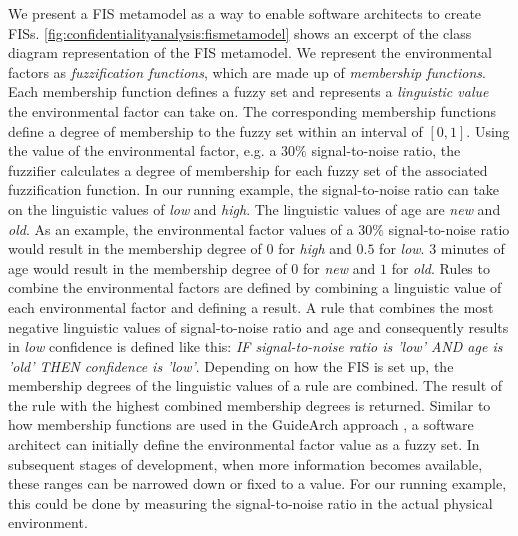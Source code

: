 We present a \ac{FIS} metamodel as a way to enable software architects to create \acp{FIS}.
\autoref{fig:confidentialityanalysis:fismetamodel} shows an excerpt of the class diagram representation of the FIS metamodel. 
We represent the environmental factors as \emph{fuzzification functions}, which are made up of \emph{membership functions}. 
Each membership function defines a fuzzy set and represents a \emph{linguistic value} the environmental factor can take on. 
The corresponding membership functions define a degree of membership to the fuzzy set within an interval of $[0,1]$. 
Using the value of the environmental factor, e.g. a $30 \%$ signal-to-noise ratio, the fuzzifier calculates a degree of membership for each fuzzy set of the associated fuzzification function. 
In our running example, the signal-to-noise ratio can take on the linguistic values of \emph{low} and \emph{high}. 
The linguistic values of age are \emph{new} and \emph{old}.
As an example, the environmental factor values of a $30 \%$ signal-to-noise ratio would result in the membership degree of $0$ for \emph{high} and $0.5$ for \emph{low}. 
3 minutes of age would result in the membership degree of $0$ for \emph{new} and $1$ for \emph{old}.
Rules to combine the environmental factors are defined by combining a linguistic value of each environmental factor and defining a result. 
A rule that combines the most negative linguistic values of signal-to-noise ratio and age and consequently results in \emph{low} confidence is defined like this: \emph{IF signal-to-noise ratio is 'low' AND age is 'old' THEN confidence is 'low'}. 
Depending on how the \ac{FIS} is set up, the membership degrees of the linguistic values of a rule are combined. 
The result of the rule with the highest combined membership degrees is returned. 
Similar to how membership functions are used in the GuideArch approach \cite{esfahani_guidearch_2013}, a software architect can initially define the environmental factor value as a fuzzy set. 
In subsequent stages of development, when more information becomes available, these ranges can be narrowed down or fixed to a value. 
For our running example, this could be done by measuring the signal-to-noise ratio in the actual physical environment.

